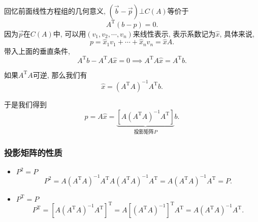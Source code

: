 回忆前面线性方程组的几何意义, $(\vec{b}-\vec{p})\bot C(A)$等价于
\begin{equation}
  A^{\mathrm{T}} \left( b-p \right) = 0. 
\end{equation}
因为$\vec{p}$在$C(A)$中, 可以用$(v_1,v_2,\cdots,v_n)$来线性表示, 表示系数记为$\hat{x}$, 具体来说,
\begin{equation}
  p = \hat{x}_1 v_1 + \cdots + \hat{x}_n v_n = \hat{x} A.
\end{equation}
带入上面的垂直条件, 
\begin{equation}
  A^{\mathrm{T}}b - A^{\mathrm{T}}A \hat{x} = 0 \implies A^{\mathrm{T}} A \hat{x} = A^{\mathrm{T}} b .
\end{equation}

如果$A^{\mathrm{T}}A$可逆, 那么我们有
\begin{equation}
  \hat{x} = \left( A^{\mathrm{T}}A  \right) ^{-1} A^{\mathrm{T}} b .
\end{equation}

于是我们得到
\begin{equation}
  p = A \hat{x} = \underbrace{\left[ A \left( A^{\mathrm{T}}A \right) ^{-1} A^{\mathrm{T}} \right] }_{\text{投影矩阵} P} b .
\end{equation}

\subsubsection{投影矩阵的性质}
\begin{itemize}
    \item $P^{2}=P$
    \begin{equation}
      P^{2} = A \left( A^{\mathrm{T}}A \right) ^{-1} A^{\mathrm{T}} A \left( A^{\mathrm{T}}A \right)^{-1} A^{\mathrm{T}} = A\left( A^{\mathrm{T}}A \right) ^{-1} A^{\mathrm{T}} = P.
    \end{equation}

    \item $P^{\mathrm{T}}=P$
    \begin{equation}
      P^{\mathrm{T}} = \left[ A \left( A^{\mathrm{T}}A \right) ^{-1}A^{\mathrm{T}} \right] ^{\mathrm{T}} = A \left[ \left( A^{\mathrm{T}}A \right) ^{-1} \right] ^{\mathrm{T}} A^{\mathrm{T}} = A \left( A^{\mathrm{T}}A \right) ^{-1} A^{\mathrm{T}}.
    \end{equation}
\end{itemize}